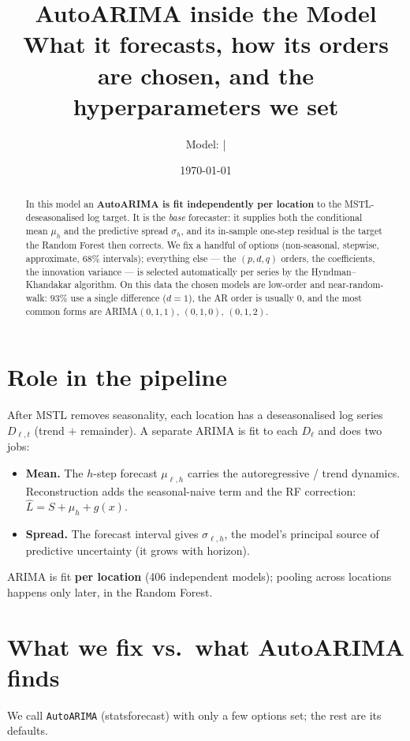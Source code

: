 \documentclass[11pt]{article}
\title{\vspace{-1.5em}AutoARIMA inside the \code{mstl\_multistep} Model\\[0.3em]
\large What it forecasts, how its orders are chosen, and the hyperparameters we set}
\author{Model: \code{config\_tgtlag3\_var} \;|\; \code{statsforecast 2.0.3}}
\date{\today}
\newcommand{\code}[1]{\texttt{\small #1}}
\begin{document}
\maketitle
\vspace{-1.5em}

\begin{abstract}
\noindent
In this model an \textbf{AutoARIMA is fit independently per location} to the MSTL-deseasonalised
log target. It is the \emph{base} forecaster: it supplies both the conditional mean
$\mu_h$ and the predictive spread $\sigma_h$, and its in-sample one-step residual is the
target the Random Forest then corrects. We fix a handful of options (non-seasonal,
stepwise, approximate, $68\%$ intervals); everything else --- the $(p,d,q)$ orders, the
coefficients, the innovation variance --- is selected automatically per series by the
Hyndman--Khandakar algorithm. On this data the chosen models are low-order and
near-random-walk: $93\%$ use a single difference ($d{=}1$), the AR order is usually $0$,
and the most common forms are ARIMA$(0,1,1)$, $(0,1,0)$, $(0,1,2)$.
\end{abstract}

\section{Role in the pipeline}
After MSTL removes seasonality, each location has a deseasonalised log series
$D_{\ell,t}$ (trend $+$ remainder). A separate ARIMA is fit to each $D_\ell$ and does two jobs:
\begin{itemize}
\item \textbf{Mean.} The $h$-step forecast $\mu_{\ell,h}$ carries the autoregressive / trend
      dynamics. Reconstruction adds the seasonal-naive term and the RF correction:
      $\hat L = S + \mu_h + g(x)$.
\item \textbf{Spread.} The forecast interval gives $\sigma_{\ell,h}$, the model's principal
      source of predictive uncertainty (it grows with horizon).
\end{itemize}
ARIMA is fit \textbf{per location} (406 independent models); pooling across locations happens
only later, in the Random Forest.

\section{What we fix vs.\ what AutoARIMA finds}

We call \code{AutoARIMA} (statsforecast) with only a few options set; the rest are its defaults.
\end{document}
